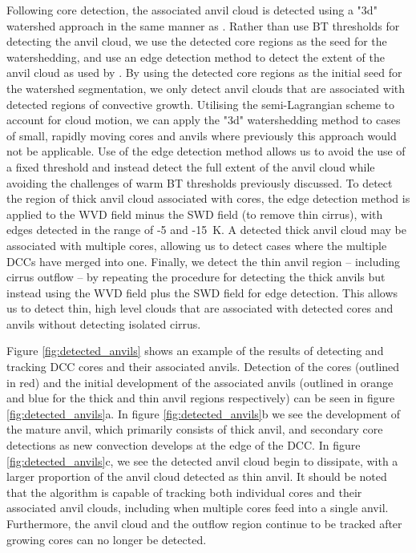 Following core detection, the associated anvil cloud is detected using a "3d" watershed approach in the same manner as \citet{fiolleau_algorithm_2013}.
Rather than use BT thresholds for detecting the anvil cloud, we use the detected core regions as the seed for the watershedding, and use an edge detection method to detect the extent of the anvil cloud as used by \citet{dim_alternative_2013}.
By using the detected core regions as the initial seed for the watershed segmentation, we only detect anvil clouds that are associated with detected regions of convective growth.
Utilising the semi-Lagrangian scheme to account for cloud motion, we can apply the "3d" watershedding method to cases of small, rapidly moving cores and anvils where previously this approach would not be applicable.
Use of the edge detection method allows us to avoid the use of a fixed threshold and instead detect the full extent of the anvil cloud while avoiding the challenges of warm BT thresholds previously discussed.
To detect the region of thick anvil cloud associated with cores, the edge detection method is applied to the WVD field minus the SWD field (to remove thin cirrus), with edges detected in the range of -5 and -15~\unit{K}.
A detected thick anvil cloud may be associated with multiple cores, allowing us to detect cases where the multiple DCCs have merged into one.
Finally, we detect the thin anvil region -- including cirrus outflow -- by repeating the procedure for detecting the thick anvils but instead using the WVD field plus the SWD field for edge detection.
This allows us to detect thin, high level clouds that are associated with detected cores and anvils without detecting isolated cirrus.

Figure \ref{fig:detected_anvils} shows an example of the results of detecting and tracking DCC cores and their associated anvils.
Detection of the cores (outlined in red) and the initial development of the associated anvils (outlined in orange and blue for the thick and thin anvil regions respectively) can be seen in figure \ref{fig:detected_anvils}a.
In figure \ref{fig:detected_anvils}b we see the development of the mature anvil, which primarily consists of thick anvil, and secondary core detections as new convection develops at the edge of the DCC.
In figure \ref{fig:detected_anvils}c, we see the detected anvil cloud begin to dissipate, with a larger proportion of the anvil cloud detected as thin anvil.
It should be noted that the algorithm is capable of tracking both individual cores and their associated anvil clouds, including when multiple cores feed into a single anvil.
Furthermore, the anvil cloud and the outflow region continue to be tracked after growing cores can no longer be detected.


